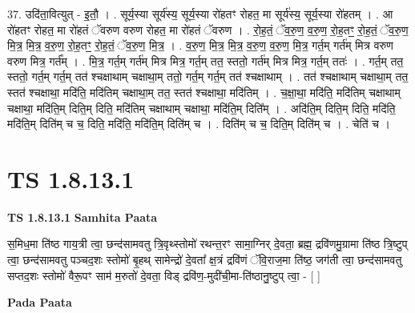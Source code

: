 \documentclass[17pt]{extarticle}
\begin{document}
37. उदि॑ता॒वित्युत् - इ॒तौ॒ । . सूर्य॒स्या सूर्य॑स्य॒ सूर्य॒स्या रो॑हतꣳ रोहत॒ मा सूर्य॑स्य॒ सूर्य॒स्या रो॑हतम् । . आ रो॑हतꣳ रोहत॒ मा रो॑हतं ॅवरुण वरुण रोहत॒ मा रो॑हतं ॅवरुण । . रो॒ह॒तं॒ ॅव॒रु॒ण॒ व॒रु॒ण॒ रो॒ह॒तꣳ॒॒ रो॒ह॒तं॒ ॅव॒रु॒ण॒ मि॒त्र॒ मि॒त्र॒ व॒रु॒ण॒ रो॒ह॒तꣳ॒॒ रो॒ह॒तं॒ ॅव॒रु॒ण॒ मि॒त्र॒ । . व॒रु॒ण॒ मि॒त्र॒ मि॒त्र॒ व॒रु॒ण॒ व॒रु॒ण॒ मि॒त्र॒ गर्त॒म् गर्त॑म् मित्र वरुण वरुण मित्र॒ गर्त᳚म् । . मि॒त्र॒ गर्त॒म् गर्त॑म् मित्र मित्र॒ गर्त॒म् तत॒ स्ततो॒ गर्त॑म् मित्र मित्र॒ गर्त॒म् ततः॑ । . गर्त॒म् तत॒ स्ततो॒ गर्त॒म् गर्त॒म् तत॑ श्चक्षाथाम् चक्षाथा॒म् ततो॒ गर्त॒म् गर्त॒म् तत॑ श्चक्षाथाम् । . तत॑ श्चक्षाथाम् चक्षाथा॒म् तत॒ स्तत॑ श्चक्षाथा॒ मदि॑ति॒ मदि॑तिम् चक्षाथा॒म् तत॒ स्तत॑ श्चक्षाथा॒ मदि॑तिम् । . च॒क्षा॒था॒ मदि॑ति॒ मदि॑तिम् चक्षाथाम् चक्षाथा॒ मदि॑ति॒म् दिति॒म् दिति॒ मदि॑तिम् चक्षाथाम् चक्षाथा॒ मदि॑ति॒म् दिति᳚म् । . अदि॑ति॒म् दिति॒म् दिति॒ मदि॑ति॒ मदि॑ति॒म् दिति॑म् च च॒ दिति॒ मदि॑ति॒ मदि॑ति॒म् दिति॑म् च । . दिति॑म् च च॒ दिति॒म् दिति॑म् च । . चेति॑ च । \newline
\pagebreak
{}
\section*{ TS 1.8.13.1 }

\textbf{TS 1.8.13.1 } \newline
\textbf{Samhita Paata} \newline

स॒मिध॒मा ति॑ष्ठ गाय॒त्री त्वा॒ छन्द॑सामवतु त्रि॒वृथ्स्तोमो॑ रथन्त॒रꣳ सामा॒ग्निर् दे॒वता॒ ब्रह्म॒ द्रवि॑णमु॒ग्रामा ति॑ष्ठ त्रि॒ष्टुप् त्वा॒ छन्द॑सामवतु पञ्चद॒शः स्तोमो॑ बृ॒हथ् सामेन्द्रो॑ दे॒वता᳚ क्ष॒त्रं द्रवि॑णं ॅवि॒राज॒मा ति॑ष्ठ॒ जग॑ती त्वा॒ छन्द॑सामवतु सप्तद॒शः स्तोमो॑ वैरू॒पꣳ साम॑ म॒रुतो॑ दे॒वता॒ विड् द्रवि॑ण॒-मुदी॑ची॒मा-ति॑ष्ठानु॒ष्टुप् त्वा॒ - [ ] \newline

\textbf{Pada Paata} \newline
\end{document}
